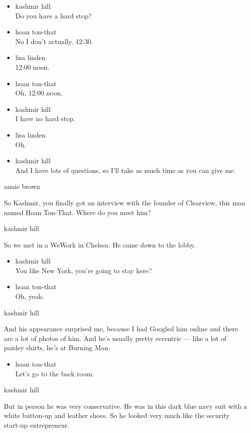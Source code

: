 \begin{itemize}
\item
  kashmir hill\\
  Do you have a hard stop?
\item
  hoan ton-that\\
  No I don't actually. 12:30.
\item
  lisa linden\\
  12:00 noon.
\item
  hoan ton-that\\
  Oh, 12:00 noon.
\item
  kashmir hill\\
  I have no hard stop.
\item
  lisa linden\\
  Oh.
\item
  kashmir hill\\
  And I have lots of questions, so I'll take as much time as you can
  give me.
\end{itemize}

annie brown

So Kashmir, you finally got an interview with the founder of Clearview,
this man named Hoan Ton-That. Where do you meet him?

kashmir hill

So we met in a WeWork in Chelsea. He came down to the lobby.

\begin{itemize}
\item
  kashmir hill\\
  You like New York, you're going to stay here?
\item
  hoan ton-that\\
  Oh, yeah.
\end{itemize}

kashmir hill

And his appearance surprised me, because I had Googled him online and
there are a lot of photos of him. And he's usually pretty eccentric ---
like a lot of paisley shirts, he's at Burning Man.

\begin{itemize}
\tightlist
\item
  hoan ton-that\\
  Let's go to the back room.
\end{itemize}

kashmir hill

But in person he was very conservative. He was in this dark blue navy
suit with a white button-up and leather shoes. So he looked very much
like the security start-up entrepreneur.

